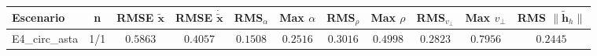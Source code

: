 \begin{tabular}{lcccccccccc}
\toprule
Escenario & n & RMSE $\tilde{\mathbf{x}}$ & RMSE $\dot{\tilde{\mathbf{x}}}$ & RMS$_\alpha$ & Max $\alpha$ & RMS$_\rho$ & Max $\rho$ & RMS$_{v_\perp}$ & Max $v_\perp$ & RMS $\|\tilde{\mathbf{h}}_h\|$ \\
\midrule
E4\_circ\_asta & 1/1 & $0.5863$ & $0.4057$ & $0.1508$ & $0.2516$ & $0.3016$ & $0.4998$ & $0.2823$ & $0.7956$ & $0.2445$ \\
\bottomrule
\end{tabular}
